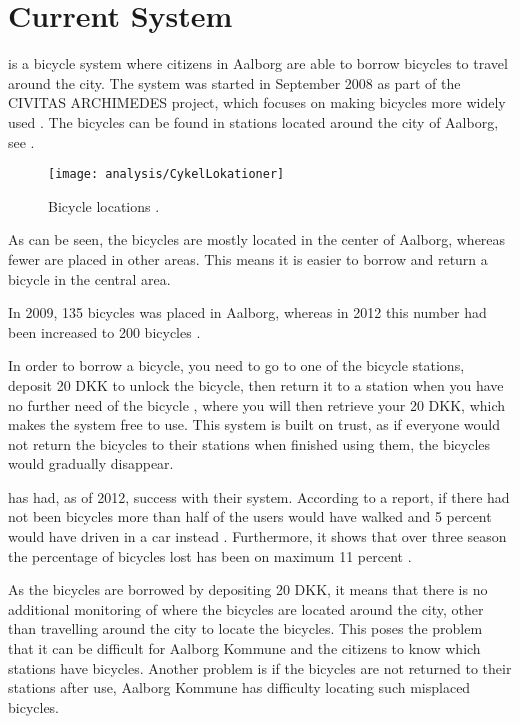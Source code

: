 \section{Current System}


\bycykel is a bicycle system where citizens in Aalborg are able to borrow bicycles to travel around the city.
The system was started in September 2008 as part of the CIVITAS ARCHIMEDES project, which focuses on making bicycles more widely used \citep{misc:aalborgcykling}.
The bicycles can be found in stations located around the city of Aalborg, see .

\begin{figure}
	\centering
	\texttt{[image: analysis/CykelLokationer]}
	\caption{Bicycle locations \citep{misc:aalborgbycykel}.}
	\label{fig:CykelLokationer}
\end{figure}

As can be seen, the bicycles are mostly located in the center of Aalborg, whereas fewer are placed in other areas.
This means it is easier to borrow and return a bicycle in the central area.

In 2009, 135 bicycles was placed in Aalborg, whereas in 2012 this number had been increased to 200 bicycles \citep{misc:aalborgcykling}.

In order to borrow a bicycle, you need to go to one of the bicycle stations, deposit 20 DKK to unlock the bicycle, then return it to a station when you have no further need of the bicycle \citep{misc:aalborgbycykelregler}, where you will then retrieve your 20 DKK, which makes the system free to use.
This system is built on trust, as if everyone would not return the bicycles to their stations when finished using them, the bicycles would gradually disappear.

\bycykel has had, as of 2012, success with their system. According to a report, if there had not been bicycles more than half of the users would have walked and 5 percent would have driven in a car instead \citep{misc:aalborgcykling}.
Furthermore, it shows that over three season the percentage of bicycles lost has been on maximum 11 percent \citep{misc:aalborgcykling}.

As the bicycles are borrowed by depositing 20 DKK, it means that there is no additional monitoring of where the bicycles are located around the city, other than travelling around the city to locate the bicycles.
This poses the problem that it can be difficult for Aalborg Kommune and the citizens to know which stations have bicycles.
Another problem is if the bicycles are not returned to their stations after use, Aalborg Kommune has difficulty locating such misplaced bicycles.

